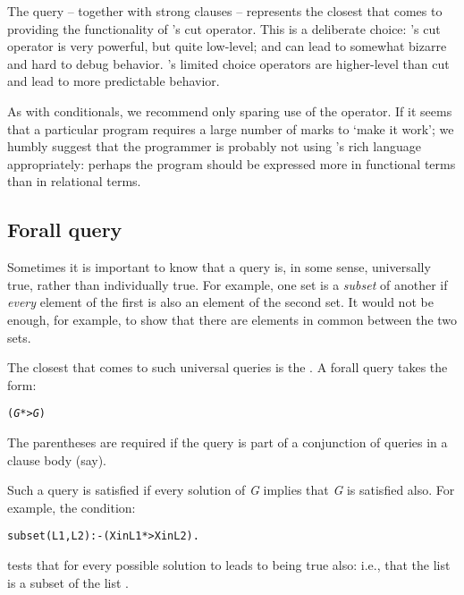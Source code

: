 The \q{!} query -- together with strong clauses -- represents the closest that \go comes to providing the functionality of \prolog's cut operator. This is a deliberate choice: \prolog's cut operator is very powerful, but quite low-level; and can lead to somewhat bizarre and hard to debug behavior. \go's limited choice operators are higher-level than cut and lead to more predictable behavior.

\begin{aside}
As with conditionals, we recommend only sparing use of the \q{!} operator. If it seems that a particular program requires a large number of \q{!} marks to `make it work'; we humbly suggest that the programmer is probably not using \go's rich language appropriately: perhaps the program should be expressed more in functional terms than in relational terms.
\end{aside}

\subsection{Forall query}
\label{goal:forall}
Sometimes it is important to know that a query is, in some sense, universally true, rather than individually true. For example, one set is a \emph{subset} of another if \emph{every} element of the first is also an element of the second set. It would not be enough, for example, to show that there are elements in common between the two sets.

The closest that \go comes to such universal queries is the .
A forall query takes the form:
\begin{alltt}
(\emph{G} *> \emph{G})
\end{alltt}
The parentheses are required if the \q{*>} query is part of a conjunction of queries in a clause body (say).

Such a query is satisfied if every solution of \emph{G} implies that \emph{G} is satisfied also. For example, the condition:
\begin{alltt}
subset(L1,L2) :- (X in L1 *> X in L2).
\end{alltt}
tests that for every possible solution to  leads to  being true also: i.e., that the list  is a subset of the list .

